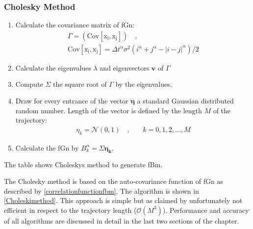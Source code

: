 \documentclass[
  a4paper,BCOR10mm,oneside,
  headsepline,footsepline,%
  fleqn,openbib
]{scrbook}
\begin{document}
\subsubsection{Cholesky Method}
\begin{table}
\begin{framed}
\begin{enumerate}
 \item Calculate the covariance matrix of fGn:
 \begin{align}
  \Gamma=(\mathrm{Cov[x_i,x_j]}) \quad , \\  \mathrm{Cov[x_i,x_j]}=\Delta t^\alpha \sigma^2(i^{\alpha}+j^{\alpha}-|i-j|^\alpha)/2
 \end{align}
\item Calculate the eigenvalues $\lambda$ and eigenvectors $\bm{v}$ of $\Gamma$ 
\item Compute $\Sigma$ the square root of $\Gamma$ by the eigenvalues.
\item Draw for every entrance of the vector $\bm{\eta}$  a standard Gaussian distributed random number. Length of the vector is defined by the length $M$ of the trajectory:
\begin{align}
 \eta_k= \mathcal{N}(0,1) \quad \text{,}  \qquad k=0,1,2,...,M 
\end{align}
\item Calculate the fGn by $B^{\alpha}_k =\Sigma \bm{\eta_k}$.
\end{enumerate}
\end{framed}
\caption{The table shows Choleskys method to generate fBm.}
\label{Choleskimethod}
\end{table}
The Cholesky method \cite{Dieker2004} is based on the auto-covariance function of fGn as described by \cref{correlationfunctionfbm}. The algorithm is shown in \cref{Choleskimethod}. This approach is simple but as claimed by \citet{Dieker2004} unfortunately not efficient in respect to the trajectory length ($\mathcal{O}(M^3)$). Performance and accuracy of all algorithms are discussed in detail in the last two sections of the chapter.
\end{document}
